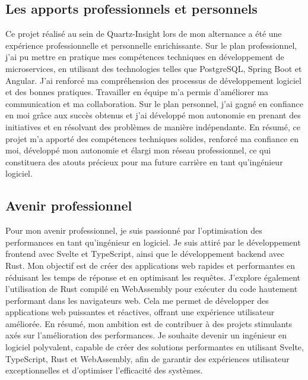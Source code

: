 \documentclass[a4paper, 11pt]{report}
\begin{document}
\subsection{Les apports professionnels et personnels}
Ce projet réalisé au sein de Quartz-Insight lors de mon alternance a été une expérience professionnelle et personnelle enrichissante.
Sur le plan professionnel, j'ai pu mettre en pratique mes compétences techniques en développement de microservices, en utilisant des technologies telles que PostgreSQL, Spring Boot et Angular.
J'ai renforcé ma compréhension des processus de développement logiciel et des bonnes pratiques. 
Travailler en équipe m'a permis d'améliorer ma communication et ma collaboration.
Sur le plan personnel, j'ai gagné en confiance en moi grâce aux succès obtenus et j'ai développé mon autonomie en prenant des initiatives et en résolvant des problèmes de manière indépendante.
En résumé, ce projet m'a apporté des compétences techniques solides, renforcé ma confiance en moi, développé mon autonomie et élargi mon réseau professionnel, ce qui constituera des atouts précieux pour ma future carrière en tant qu'ingénieur logiciel.

\subsection{Avenir professionnel}
Pour mon avenir professionnel, je suis passionné par l'optimisation des performances en tant qu'ingénieur en logiciel. Je suis attiré par le développ\-ement frontend avec Svelte et TypeScript, ainsi que le développement backend avec Rust. Mon objectif est de créer des applications web rapides et performantes en réduisant les temps de réponse et en optimisant les requêtes.
J'explore également l'utilisation de Rust compilé en WebAssembly pour exécuter du code hautement performant dans les navigateurs web. Cela me permet de développer des applications web puissantes et réactives, offrant une expérience utilisateur améliorée.
En résumé, mon ambition est de contribuer à des projets stimulants axés sur l'amélioration des performances. Je souhaite devenir un ingénieur en logiciel polyvalent, capable de créer des solutions performantes en utilisant Svelte, TypeScript, Rust et WebAssembly, afin de garantir des expériences utilisateur exceptionnelles et d'optimiser l'efficacité des systèmes.
\end{document}
